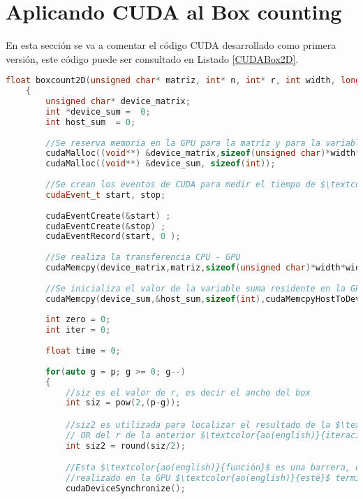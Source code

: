 \section{Aplicando CUDA al Box counting}

En esta sección se va a comentar el código CUDA desarrollado como primera versión, este código puede ser consultado en Listado \ref{CUDABox2D}.

\begin{lstlisting}[language=C++,caption={Primera versión del Boxcount2D paralelizado con CUDA},label=CUDABox2D,basicstyle=\tiny]
    float boxcount2D(unsigned char* matriz, int* n, int* r, int width, long p, int TPB)
    {
        unsigned char* device_matrix;
        int *device_sum =  0;
        int host_sum  = 0;
    
        //Se reserva memoria en la GPU para la matriz y para la variable suma
        cudaMalloc((void**) &device_matrix,sizeof(unsigned char)*width*width);
        cudaMalloc((void**) &device_sum, sizeof(int));
    
        //Se crean los eventos de CUDA para medir el tiempo de $\textcolor{ao(english)}{ejecución}$ del Boxcount
        cudaEvent_t start, stop;
        
        cudaEventCreate(&start) ;
        cudaEventCreate(&stop) ;
        cudaEventRecord(start, 0 );
    
        //Se realiza la transferencia CPU - GPU
        cudaMemcpy(device_matrix,matriz,sizeof(unsigned char)*width*width,cudaMemcpyHostToDevice);
        
        //Se inicializa el valor de la variable suma residente en la GPU a 0
        cudaMemcpy(device_sum,&host_sum,sizeof(int),cudaMemcpyHostToDevice);
    
        int zero = 0;
        int iter = 0;
    
        float time = 0;
    
        for(auto g = p; g >= 0; g--)
        {
            //siz es el valor de r, es decir el ancho del box
            int siz = pow(2,(p-g));

            //siz2 es utilizada para localizar el resultado de la $\textcolor{ao(english)}{operación}$ 
            // OR del r de la anterior $\textcolor{ao(english)}{iteración}$
            int siz2 = round(siz/2);

            //Esta $\textcolor{ao(english)}{función}$ es una barrera, que obliga a esperar a que todo el trabajo 
            //realizado en la GPU $\textcolor{ao(english)}{esté}$ terminado.
            cudaDeviceSynchronize();
    

\end{lstlisting}
